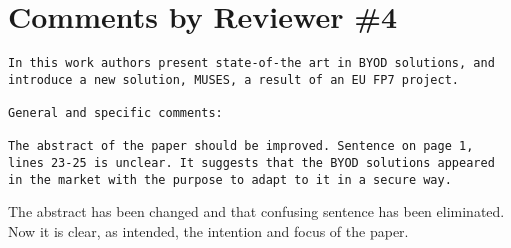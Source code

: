 \documentclass[preprint]{elsarticle}
\begin{document}
\section{Comments by Reviewer \#4}

\begin{verbatim}
In this work authors present state-of-the art in BYOD solutions, and introduce a new solution, MUSES, a result of an EU FP7 project.

General and specific comments:

The abstract of the paper should be improved. Sentence on page 1,
lines 23-25 is unclear. It suggests that the BYOD solutions appeared
in the market with the purpose to adapt to it in a secure way. 
\end{verbatim}

The abstract has been changed and that confusing sentence has been
eliminated. Now it is clear, as intended, the intention and focus of
the paper. 
\end{document}
